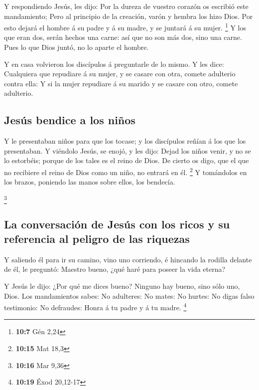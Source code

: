  Y respondiendo Jesús, les dijo: Por la dureza de vuestro
corazón os escribió este mandamiento;  Pero al principio de
la creación, varón y hembra los hizo Dios.  Por esto dejará
el hombre á su padre y á su madre, y se juntará á su mujer. \footnote{\textbf{10:7}
  Gén 2,24}  Y los que eran dos, serán hechos una carne: así
que no son más dos, sino una carne.  Pues lo que Dios juntó,
no lo aparte el hombre.

 Y en casa volvieron los discípulos á preguntarle de lo
mismo.  Y les dice: Cualquiera que repudiare á su mujer, y
se casare con otra, comete adulterio contra ella:  Y si la
mujer repudiare á su marido y se casare con otro, comete adulterio.

\hypertarget{jesuxfas-bendice-a-los-niuxf1os}{%
\subsection{Jesús bendice a los
niños}\label{jesuxfas-bendice-a-los-niuxf1os}}

 Y le presentaban niños para que los tocase; y los
discípulos reñían á los que los presentaban.  Y viéndolo
Jesús, se enojó, y les dijo: Dejad los niños venir, y no se lo
estorbéis; porque de los tales es el reino de Dios.  De
cierto os digo, que el que no recibiere el reino de Dios como un niño,
no entrará en él. \footnote{\textbf{10:15} Mat 18,3}  Y
tomándolos en los brazos, poniendo las manos sobre ellos, los bendecía.

\footnote{\textbf{10:16} Mar 9,36}

\hypertarget{la-conversaciuxf3n-de-jesuxfas-con-los-ricos-y-su-referencia-al-peligro-de-las-riquezas}{%
\subsection{La conversación de Jesús con los ricos y su referencia al
peligro de las
riquezas}\label{la-conversaciuxf3n-de-jesuxfas-con-los-ricos-y-su-referencia-al-peligro-de-las-riquezas}}

 Y saliendo él para ir su camino, vino uno corriendo, é
hincando la rodilla delante de él, le preguntó: Maestro bueno, ¿qué haré
para poseer la vida eterna?

 Y Jesús le dijo: ¿Por qué me dices bueno? Ninguno hay
bueno, sino sólo uno, Dios.  Los mandamientos sabes: No
adulteres: No mates: No hurtes: No digas falso testimonio: No defraudes:
Honra á tu padre y á tu madre. \footnote{\textbf{10:19} Éxod 20,12-17}

